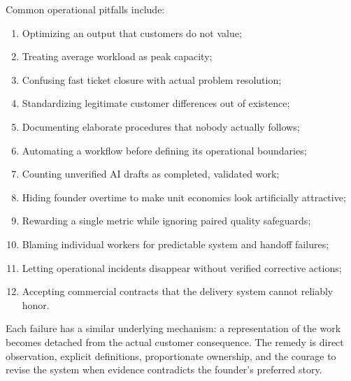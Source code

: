 Common operational pitfalls include:
\begin{enumerate}
    \item Optimizing an output that customers do not value;
    \item Treating average workload as peak capacity;
    \item Confusing fast ticket closure with actual problem resolution;
    \item Standardizing legitimate customer differences out of existence;
    \item Documenting elaborate procedures that nobody actually follows;
    \item Automating a workflow before defining its operational boundaries;
    \item Counting unverified AI drafts as completed, validated work;
    \item Hiding founder overtime to make unit economics look artificially attractive;
    \item Rewarding a single metric while ignoring paired quality safeguards;
    \item Blaming individual workers for predictable system and handoff failures;
    \item Letting operational incidents disappear without verified corrective actions;
    \item Accepting commercial contracts that the delivery system cannot reliably honor.
\end{enumerate}

Each failure has a similar underlying mechanism: a representation of the work becomes detached from the actual customer consequence. The remedy is direct observation, explicit definitions, proportionate ownership, and the courage to revise the system when evidence contradicts the founder's preferred story.
